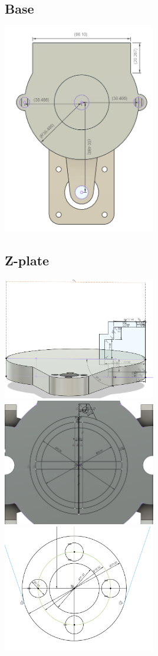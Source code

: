 
\subsection{Base}
\includegraphics[width=0.5\textwidth]{3dprints/base_top.png}


\subsection{Z-plate}
\includegraphics[width=0.5\textwidth]{3dprints/z_plate.png}
\includegraphics[width=0.5\textwidth]{3dprints/z_plate_bottompng.png}
\includegraphics[width=0.5\textwidth]{3dprints/gold_bearing_holder.png}



